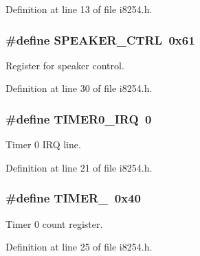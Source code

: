 Definition at line 13 of file i8254.\+h.

\hypertarget{group__i8254_ga51b3a5e3d4811ca063fe25e35560ab40}{}
\subsubsection[{S\+P\+E\+A\+K\+E\+R\+\_\+\+C\+T\+R\+L}]{\setlength{\rightskip}{0pt plus 5cm}\#define S\+P\+E\+A\+K\+E\+R\+\_\+\+C\+T\+R\+L~0x61}\label{group__i8254_ga51b3a5e3d4811ca063fe25e35560ab40}


Register for speaker control. 



Definition at line 30 of file i8254.\+h.

\hypertarget{group__i8254_ga30bf84c312af248cb81bb224e09f9ba8}{}
\subsubsection[{T\+I\+M\+E\+R0\+\_\+\+I\+R\+Q}]{\setlength{\rightskip}{0pt plus 5cm}\#define T\+I\+M\+E\+R0\+\_\+\+I\+R\+Q~0}\label{group__i8254_ga30bf84c312af248cb81bb224e09f9ba8}


Timer 0 I\+R\+Q line. 



Definition at line 21 of file i8254.\+h.

\hypertarget{group__i8254_gacc9ff9df4a9674a1ce9ba08fc4a4679e}{}
\subsubsection[{T\+I\+M\+E\+R\+\_\+0}]{\setlength{\rightskip}{0pt plus 5cm}\#define T\+I\+M\+E\+R\+\_~0x40}\label{group__i8254_gacc9ff9df4a9674a1ce9ba08fc4a4679e}


Timer 0 count register. 



Definition at line 25 of file i8254.\+h.

\hypertarget{group__i8254_gac62c99c2a9289891c1b83052242cca49}{}
